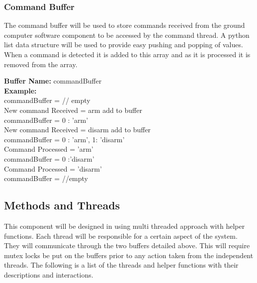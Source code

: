 \documentclass[10pt,draftclsnofoot,onecolumn,retainorgcmds]{IEEEtran}
\begin{document}
\subsubsection{Command Buffer}
The command buffer will be used to store commands received from the ground computer software component to be accessed by the command thread. A python list data structure will be used to provide easy pushing and popping of values. When a command is detected it is added to this array and as it is processed it is removed from the array.\par
{\bf Buffer Name:} commandBuffer \\
{\bf Example:}\\
commandBuffer = {} // empty \\
New command Received = arm add to buffer \\
commandBuffer = {0 : 'arm'} \\
New command Received = disarm add to buffer \\
commandBuffer = {0 : 'arm', 1:  'disarm'} \\
Command Processed = 'arm' \\
commandBuffer = { 0 :'disarm'} \\
Command Processed = 'disarm' \\
commandBuffer = {} //empty \\


\subsection{Methods and Threads}
This component will be designed in using multi threaded approach with helper functions. Each thread will be responsible for a certain aspect of the system. They will communicate through the two buffers detailed above. This will require mutex locks be put on the buffers prior to any action taken from the independent threads. The following is a list of the threads and helper functions with their descriptions and interactions.
\end{document}
